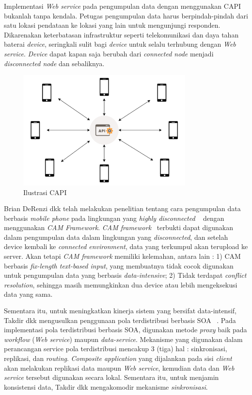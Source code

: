 Implementasi \textit{Web service} pada pengumpulan data dengan menggunakan CAPI bukanlah tanpa kendala. Petugas pengumpulan data harus berpindah-pindah dari satu lokasi pendataan ke lokasi yang lain untuk mengunjungi responden. Dikarenakan keterbatasan infrastruktur seperti telekomunikasi dan daya tahan baterai \textit{device}, seringkali sulit bagi \textit{device} untuk selalu terhubung dengan \textit{Web service}. \textit{Device} dapat kapan saja berubah dari \textit{connected node} menjadi \textit{disconnected node} dan sebaliknya. 

\begin{figure}
    \centering
    \includegraphics[height=6cm]{images/CAPI-Ilustration}
    \caption{Ilustrasi CAPI}
    \label{fig:capi-ilustration}
\end{figure}

Brian DeRenzi dkk telah melakukan penelitian tentang cara pengumpulan data berbasis \textit{mobile phone} pada lingkungan yang \textit{highly disconnected} ~\cite{derenzi_reliable_2007} dengan menggunakan \textit{CAM Framework}. \textit{CAM framework}~\cite{parikh_designing_2006} terbukti dapat digunakan dalam pengumpulan data dalam lingkungan yang \textit{disconnected}, dan setelah device kembali ke \textit{connected environment}, data yang terkumpul akan terupload ke server. Akan tetapi \textit{CAM framework} memiliki kelemahan, antara lain : 1) CAM berbasis \textit{fix-length text-based input}, yang membuatnya tidak cocok digunakan untuk pengumpulan data yang berbasis \textit{data-intensive}; 2) Tidak terdapat \textit{conflict resolution}, sehingga masih memungkinkan dua device atau lebih mengeksekusi data yang sama.

Sementara itu, untuk meningkatkan kinerja sistem yang bersifat data-intensif, Takdir dkk mengusulkan penggunaan pola terdistribusi berbasis SOA ~\cite{takdir_multi-layer_2014}. Pada implementasi pola terdistribusi berbasis SOA, digunakan metode \textit{proxy} baik pada \textit{workflow} (\textit{Web service}) maupun \textit{data-service}. Mekanisme yang digunakan dalam perancangan service pola terdistribusi mencakup 3 (tiga) hal : sinkronisasi, replikasi, dan \textit{routing}. \textit{Composite application} yang dijalankan pada sisi \textit{client} akan melakukan replikasi data maupun \textit{Web service}, kemudian data dan \textit{Web service} tersebut digunakan secara lokal. Sementara itu, untuk menjamin konsistensi data, Takdir dkk mengakomodir mekanisme \textit{sinkronisasi}.

